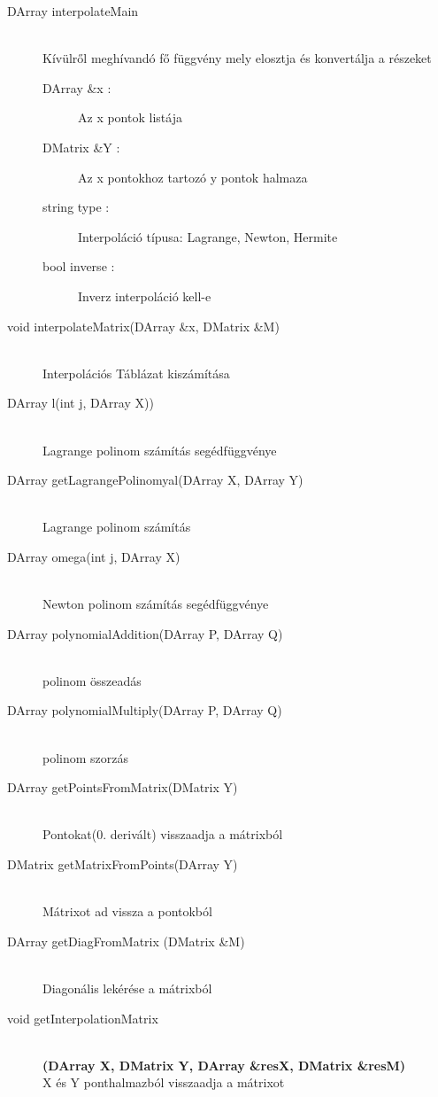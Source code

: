 	\begin{description}
		\item[DArray interpolateMain] 
			\hfill \\ Kívülről meghívandó fő függvény mely elosztja és konvertálja a részeket
			\begin{description}
			  \item[DArray \&x :] Az x pontok listája 
			  \item[DMatrix \&Y :] Az x pontokhoz tartozó y pontok halmaza
			  \item[string type :] 
			  	Interpoláció típusa: Lagrange, Newton, Hermite
			  \item[bool inverse :] Inverz interpoláció kell-e
			\end{description}
		\item[void interpolateMatrix(DArray \&x, 	DMatrix \&M)] \hfill \\ 
			Interpolációs Táblázat kiszámítása
		\item[DArray l(int j, DArray X))] \hfill \\ 
			Lagrange polinom számítás segédfüggvénye
		\item[DArray getLagrangePolinomyal(DArray X, DArray Y)] \hfill \\ 
			Lagrange polinom számítás
		\item[DArray omega(int j, DArray X)] \hfill \\ 
			Newton polinom számítás segédfüggvénye
		\item[DArray polynomialAddition(DArray P, DArray Q)] \hfill \\ 
			polinom összeadás
		\item[DArray polynomialMultiply(DArray P, DArray Q)] \hfill \\ 
			polinom szorzás
		\item[DArray getPointsFromMatrix(DMatrix Y)] \hfill \\ 
			Pontokat(0. derivált) visszaadja a mátrixból
		\item[DMatrix getMatrixFromPoints(DArray Y)] \hfill \\ 
			Mátrixot ad vissza a pontokból
		\item[DArray getDiagFromMatrix (DMatrix \&M)] 
		\hfill \\
			Diagonális lekérése a mátrixból
		\item[void getInterpolationMatrix]
		\hfill \\  \textbf{(DArray X, DMatrix Y, DArray \&resX, DMatrix \&resM)}
		\hfill \\
			 X és Y ponthalmazból visszaadja a mátrixot 
	\end{description}
